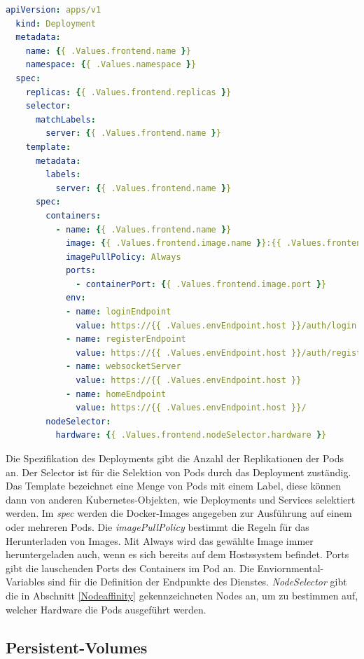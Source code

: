 \begin{lstlisting}[caption={deployment.yaml },captionpos=b,label={lst:deploymentauth},language=yaml]
  apiVersion: apps/v1
  kind: Deployment
  metadata:
    name: {{ .Values.frontend.name }}
    namespace: {{ .Values.namespace }}
  spec:
    replicas: {{ .Values.frontend.replicas }}
    selector:
      matchLabels:
        server: {{ .Values.frontend.name }}
    template:
      metadata:
        labels:
          server: {{ .Values.frontend.name }}
      spec:
        containers:
          - name: {{ .Values.frontend.name }}
            image: {{ .Values.frontend.image.name }}:{{ .Values.frontend.image.tag }}
            imagePullPolicy: Always
            ports:
              - containerPort: {{ .Values.frontend.image.port }}
            env:
            - name: loginEndpoint
              value: https://{{ .Values.envEndpoint.host }}/auth/login
            - name: registerEndpoint
              value: https://{{ .Values.envEndpoint.host }}/auth/register
            - name: websocketServer
              value: https://{{ .Values.envEndpoint.host }}
            - name: homeEndpoint
              value: https://{{ .Values.envEndpoint.host }}/
        nodeSelector:
          hardware: {{ .Values.frontend.nodeSelector.hardware }}

\end{lstlisting}

Die Spezifikation des Deployments gibt die Anzahl der Replikationen der Pods an.
Der Selector ist für die Selektion von Pods durch das Deployment zuständig.
Das Template bezeichnet eine Menge von Pods mit einem Label, diese können dann von anderen Kubernetes-Objekten, wie Deployments und Services selektiert werden.
Im \textit{spec} werden die Docker-Images angegeben zur Ausführung auf einem oder mehreren Pods.
Die \textit{imagePullPolicy} bestimmt die Regeln für das Herunterladen von Images.
Mit Always wird das gewählte Image immer heruntergeladen auch, wenn es sich bereits auf dem Hostssystem befindet.
Ports gibt die lauschenden Ports des Containers im Pod an.
Die Enviornmental-Variables sind für die Definition der Endpunkte des Dienstes.
\textit{NodeSelector} gibt die in Abschnitt \ref{Nodeaffinity} gekennzeichneten Nodes an, um zu bestimmen auf, welcher Hardware die Pods ausgeführt werden.


\subsection{Persistent-Volumes}

